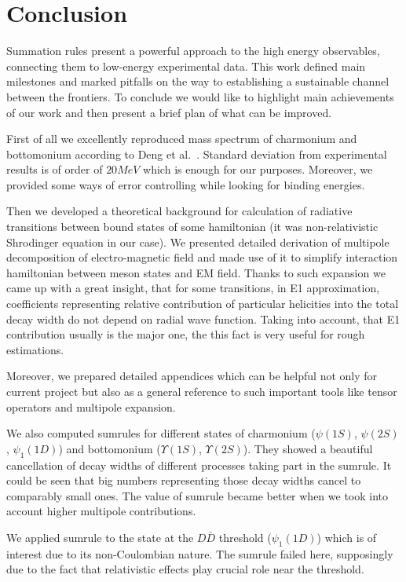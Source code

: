 \chapter{Conclusion}

Summation rules present a powerful approach to the high energy observables, connecting them to low-energy experimental data. This work defined main milestones and marked pitfalls on the way to establishing a sustainable channel between the frontiers. To conclude we would like to highlight main achievements of our work and then present a brief plan of what can be improved.

First of all we excellently reproduced mass spectrum of charmonium and bottomonium according to Deng et al.~\cite{deng-bot,deng-charm}. Standard deviation from experimental results is of order of $20MeV$ which is enough for our purposes. Moreover, we provided some ways of error controlling while looking for binding energies.

Then we developed a theoretical background for calculation of radiative transitions between bound states of some hamiltonian (it was non-relativistic Shrodinger equation in our case). We presented detailed derivation of multipole decomposition of electro-magnetic field and made use of it to simplify interaction hamiltonian between meson states and EM field. Thanks to such expansion we came up with a great insight, that for some transitions, in E1 approximation, coefficients representing relative contribution of particular helicities into the total decay width do not depend on radial wave function. Taking into account, that E1 contribution usually is the major one, the this fact is very useful for rough estimations.

Moreover, we prepared detailed appendices which can be helpful not only for current project but also as a general reference to such important tools like tensor operators and multipole expansion.

We also computed sumrules for different states of charmonium ($\psi(1S)$, $\psi(2S)$, $\psi_1(1D)$) and bottomonium ($\Upsilon(1S)$, $\Upsilon(2S)$). They showed a beautiful cancellation of decay widths of different processes taking part in the sumrule. It could be seen that big numbers representing those decay widths cancel to comparably small ones. The value of sumrule became better when we took into account higher multipole contributions.

We applied sumrule to the state at the $D\bar{D}$ threshold ($\psi_1(1D)$) which is of interest due to its non-Coulombian nature. The sumrule failed here, supposingly due to the fact that relativistic effects play crucial role near the threshold.

